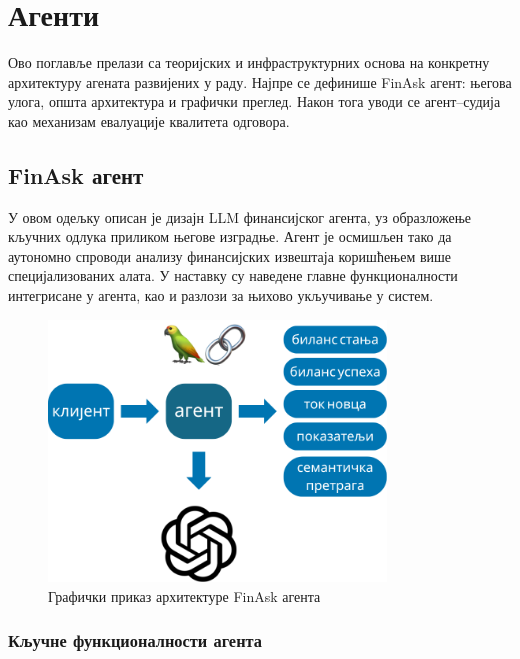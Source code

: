 \chapter{Агенти}

Ово поглавље прелази са теоријских и инфраструктурних основа на конкретну архитектуру агената развијених у раду. Најпре се дефинише FinAsk агент: његова улога, општа архитектура и графички преглед. Након тога уводи се агент–судија као механизам евалуације квалитета одговора.

\section{FinAsk агент}

У овом одељку описан је дизајн LLM финансијског агента, уз образложење кључних одлука приликом његове изградње. Агент је осмишљен тако да аутономно спроводи анализу финансијских извештаја коришћењем више специјализованих алата. У наставку су наведене главне функционалности интегрисане у агента, као и разлози за њихово укључивање у систем.

\begin{figure}[!ht]
\centering
\includegraphics[width=0.8\textwidth]{images/agent.png}
\caption{Графички приказ архитектуре FinAsk агента}
\label{fig:agent_architecture}
\end{figure}

\subsection{Кључне функционалности агента}


